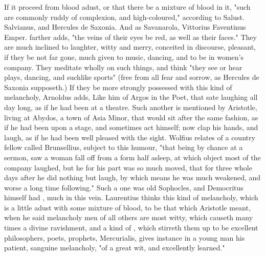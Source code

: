 {If it proceed from blood adust, or that there be a mixture of blood in it,
"such are commonly ruddy of complexion, and
high-coloured," according to Salust. Salvianus, and Hercules de Saxonia. And as
Savanarola, Vittorius Faventinus Emper. farther adds, "the
veins of their eyes be red, as well as their faces." They are much inclined to
laughter, witty and merry, conceited in discourse, pleasant, if they be not far
gone, much given to music, dancing, and to be in women's company. They meditate
wholly on such things, and think "they see or hear plays,
dancing, and suchlike sports" (free from all fear and sorrow, as
Hercules de Saxonia supposeth.) If they be more strongly
possessed with this kind of melancholy, Arnoldus adds,
 Like him of Argos in the Poet,
that sate laughing all day long, as if he had been at a
theatre. Such another is mentioned by Aristotle, living at
Abydos, a town of Asia Minor, that would sit after the same fashion, as if he
had been upon a stage, and sometimes act himself; now clap his hands, and
laugh, as if he had been well pleased with the sight. Wolfius relates of a
country fellow called Brunsellius, subject to this humour,
"that being by chance at a sermon, saw a woman fall off
from a form half asleep, at which object most of the company laughed, but he
for his part was so much moved, that for three whole days after he did nothing
but laugh, by which means he was much weakened, and worse a long time
following." Such a one was old Sophocles, and Democritus himself had , much in this vein. Laurentius  thinks this kind of melancholy, which is a little adust with some
mixture of blood, to be that which Aristotle meant, when he said melancholy men
of all others are most witty, which causeth many times a divine ravishment, and
a kind of , which stirreth them up to be excellent
philosophers, poets, prophets, \etc{} Mercurialis,  gives instance in a young man his patient, sanguine melancholy,
"of a great wit, and excellently learned."

}
